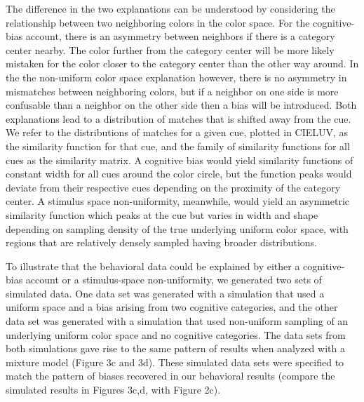 \documentclass[9pt,biorxiv,lineno,onehalfspacing]{lapreprint}
\begin{document}
\begin{refsection}
The difference in the two explanations can be understood by considering the relationship between two neighboring colors in the color space. 
For the cognitive-bias account, there is an asymmetry between neighbors if there is a category center nearby. 
The color further from the category center will be more likely mistaken for the color closer to the category center than the other way around. 
In the the non-uniform color space explanation however, there is no asymmetry in mismatches between neighboring colors, but if a neighbor on one side is more confusable than a neighbor on the other side then a bias will be introduced. 
Both explanations lead to a distribution of matches that is shifted away from the cue. 
We refer to the distributions of matches for a given cue, plotted in CIELUV, as the similarity function for that cue, and the family of similarity functions for all cues as the similarity matrix.
A cognitive bias would yield similarity functions of constant width for all cues around the color circle, but the function peaks would deviate from their respective cues depending on the proximity of the category center. 
A stimulus space non-uniformity, meanwhile, would yield an asymmetric similarity function which peaks at the cue but varies in width and shape depending on sampling density of the true underlying uniform color space, with regions that are relatively densely sampled having broader distributions.

To illustrate that the behavioral data could be explained by either a cognitive-bias account or a stimulus-space non-uniformity, we generated two sets of simulated data.
One data set was generated with a simulation that used a uniform space and a bias arising from two cognitive categories, and the other data set was generated with a simulation that used non-uniform sampling of an underlying uniform color space and no cognitive categories. 
The data sets from both simulations gave rise to the same pattern of results when analyzed with a mixture model \citep{zhang_discrete_2008, bae_why_2015} (Figure 3c and 3d). 
These simulated data sets were specified to match the pattern of biases recovered in our behavioral results (compare the simulated results in Figures 3c,d, with Figure 2c). 


\end{refsection}
\end{document}
